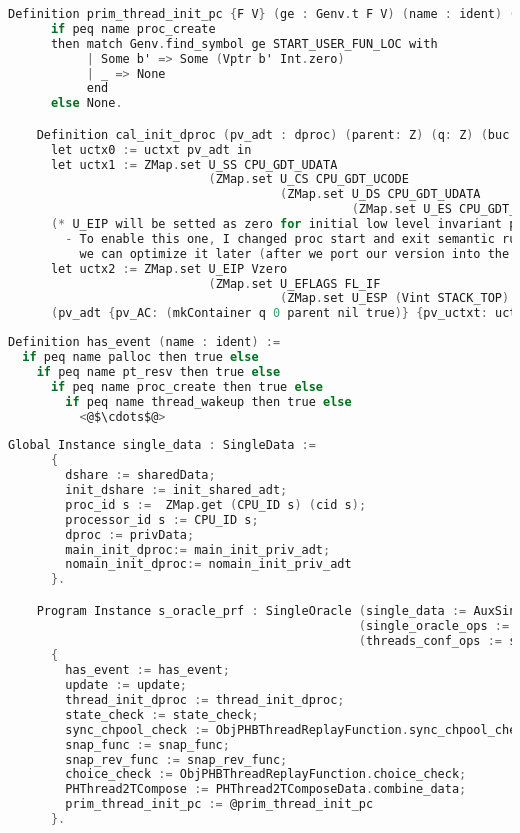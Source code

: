 \begin{lstlisting}[language=C]
    Definition prim_thread_init_pc {F V} (ge : Genv.t F V) (name : ident) (args : list lval): option val :=
      if peq name proc_create
      then match Genv.find_symbol ge START_USER_FUN_LOC with
           | Some b' => Some (Vptr b' Int.zero)
           | _ => None
           end
      else None.

    Definition cal_init_dproc (pv_adt : dproc) (parent: Z) (q: Z) (buc : block) (uc_ofs : int): dproc:= 
      let uctx0 := uctxt pv_adt in
      let uctx1 := ZMap.set U_SS CPU_GDT_UDATA
                            (ZMap.set U_CS CPU_GDT_UCODE 
                                      (ZMap.set U_DS CPU_GDT_UDATA
                                                (ZMap.set U_ES CPU_GDT_UDATA uctx0))) in
      (* U_EIP will be setted as zero for initial low level invariant proofs  
        - To enable this one, I changed proc start and exit semantic rules 
          we can optimize it later (after we port our version into the new layer framework *)
      let uctx2 := ZMap.set U_EIP Vzero
                            (ZMap.set U_EFLAGS FL_IF 
                                      (ZMap.set U_ESP (Vint STACK_TOP) uctx1)) in
      (pv_adt {pv_AC: (mkContainer q 0 parent nil true)} {pv_uctxt: uctx2}).
\end{lstlisting}

\begin{lstlisting}[language=C]
Definition has_event (name : ident) :=
  if peq name palloc then true else 
    if peq name pt_resv then true else
      if peq name proc_create then true else
        if peq name thread_wakeup then true else
          <@$\cdots$@>
\end{lstlisting}


\begin{lstlisting}[language=C]
  Global Instance single_data : SingleData :=
      {
        dshare := sharedData;
        init_dshare := init_shared_adt;
        proc_id s :=  ZMap.get (CPU_ID s) (cid s);
        processor_id s := CPU_ID s;
        dproc := privData;
        main_init_dproc:= main_init_priv_adt;
        nomain_init_dproc:= nomain_init_priv_adt
      }.

    Program Instance s_oracle_prf : SingleOracle (single_data := AuxSingleAbstractDataType.single_data) 
                                                 (single_oracle_ops := s_oracle_ops) 
                                                 (threads_conf_ops := s_threads_ops):=
      { 
        has_event := has_event;
        update := update;
        thread_init_dproc := thread_init_dproc;
        state_check := state_check;
        sync_chpool_check := ObjPHBThreadReplayFunction.sync_chpool_check;
        snap_func := snap_func;
        snap_rev_func := snap_rev_func;
        choice_check := ObjPHBThreadReplayFunction.choice_check;
        PHThread2TCompose := PHThread2TComposeData.combine_data;
        prim_thread_init_pc := @prim_thread_init_pc
      }.
\end{lstlisting}

